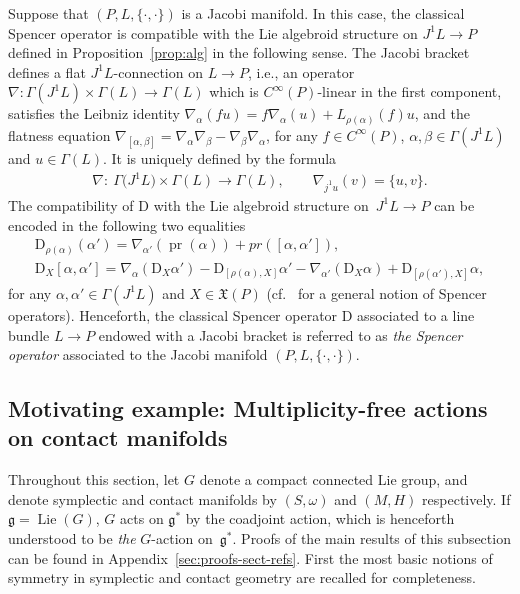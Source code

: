 \documentclass[pdftex]{sigma}
\numberwithin{equation}{section}
\newcommand{\X}{\ensuremath{\mathfrak{X}}}
\newcommand{\pr}{\operatorname{pr}}
\newcommand{\CM}{(M,H)} %
\newcommand{\SM}{(S,\omega)} %
\begin{document}
Suppose that $(P, L ,\{\cdot, \cdot\})$ is a Jacobi manifold. In this case, the classical Spencer operator is compatible with the Lie algebroid structure on $J^1L \to P$ def\/ined in Proposition~\ref{prop:alg} in the following sense. The Jacobi bracket def\/ines a f\/lat $J^1L$-connection on $L \to P$, i.e., an operator $\nabla\colon \Gamma(J^1L)\times\Gamma(L)\to \Gamma(L)$ which is $C^\infty(P)$-linear in the f\/irst component, satisf\/ies the Leibniz identity $\nabla_\alpha(fu)=f\nabla_\alpha(u)+L_{\rho(\alpha)}(f)u$, and the f\/latness equation $\nabla_{[\alpha,\beta]}=\nabla_\alpha\nabla_\beta-\nabla_\beta\nabla_\alpha$, for any $f \in C^{\infty}(P)$, $\alpha,\beta \in \Gamma(J^1L)$
and $u \in \Gamma(L)$. It is uniquely def\/ined by the formula
\begin{gather}\label{eq:nabla}
 \nabla\colon \ \Gamma\big(J^1L\big)\times\Gamma(L)\to\Gamma(L),\qquad \nabla_{j^1u}(v)= \{u,v\}.
\end{gather}
The compatibility of $\mathrm{D}$ with the Lie algebroid structure on~$J^1L \to P$ can be encoded in the following two equalities
\begin{gather}
 \label{horizontal}\mathrm{D}_{\rho(\alpha)}(\alpha') =\nabla_{\alpha'}(\pr(\alpha))+ pr([\alpha, \alpha']), \\
 \label{vertical} \mathrm{D}_X[\alpha,\alpha']=\nabla_\alpha(\mathrm{D}_X\alpha')- \mathrm{D}_{[\rho(\alpha),X]}\alpha'-\nabla_{\alpha'}(\mathrm{D}_X\alpha)+\mathrm{D}_{[\rho(\alpha'),X]}\alpha,
\end{gather}
for any $\alpha,\alpha'\in\Gamma(J^1L)$ and $X \in \X(P)$ (cf.~\cite{Maria} for a general notion of Spencer operators). Henceforth, the classical Spencer operator $\mathrm{D}$ associated to a line bundle $L \to P$ endowed with a Jacobi bracket is referred to as {\it the Spencer operator}
associated to the Jacobi manifold $(P,L,\{\cdot,\cdot\})$.

\subsection{Motivating example: Multiplicity-free actions on contact manifolds}\label{sec:motiv-famil-exampl}

Throughout this section, let $G$ denote a compact connected Lie group, and denote symplectic and contact manifolds by $\SM$ and $\CM$ respectively. If $\mathfrak{g} = \operatorname{Lie}(G)$, $G$ acts on $\mathfrak{g}^*$ by the coadjoint action, which is henceforth understood to be {\em the} $G$-action on~$\mathfrak{g}^*$. Proofs of the main results of this subsection can be found in Appendix~\ref{sec:proofs-sect-refs}. First the most basic notions of symmetry in symplectic and contact geometry are recalled for completeness.
\end{document}
